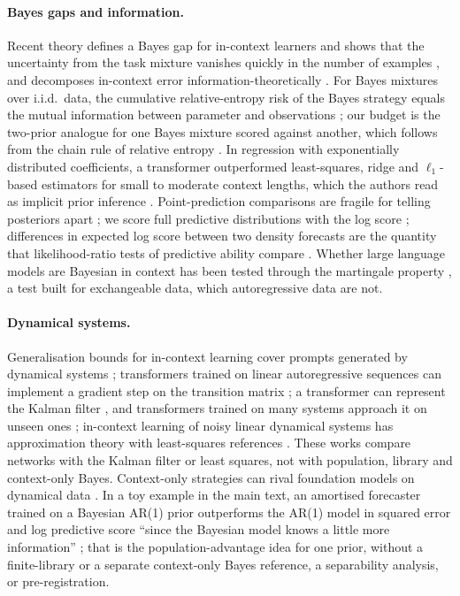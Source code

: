 \paragraph{Bayes gaps and information.} Recent theory defines a Bayes gap for in-context learners and shows that the
uncertainty from the task mixture vanishes quickly in the number of examples \citep{wakayama2026}, and decomposes in-context
error information-theoretically \citep{jeon2024}. For Bayes mixtures over i.i.d.\ data, the cumulative relative-entropy risk
of the Bayes strategy equals the mutual information between parameter and observations \citep{haussler1997}; our budget is the
two-prior analogue for one Bayes mixture scored against another, which follows from the chain rule of relative entropy
\citep{cover2006}. In regression with exponentially distributed coefficients, a transformer outperformed least-squares,
ridge and $\ell_1$-based estimators for small to moderate context lengths, which the authors read as implicit prior
inference \citep{cao2026}. Point-prediction comparisons are fragile for telling posteriors apart \citep{aswadi2026}; we score
full predictive distributions with the log score \citep{gneiting2007}; differences in expected log score between two density
forecasts are the quantity that likelihood-ratio tests of predictive ability compare \citep{amisano2007}. Whether large language models are Bayesian in context
has been tested through the martingale property \citep{falck2024}, a test built for exchangeable data, which autoregressive
data are not.

\paragraph{Dynamical systems.} Generalisation bounds for in-context learning cover prompts generated by dynamical systems
\citep{li2023algorithms}; transformers trained on linear autoregressive sequences can implement a gradient step on the
transition matrix \citep{sander2024}; a transformer can represent the Kalman filter \citep{goel2024kalman}, and transformers
trained on many systems approach it on unseen ones \citep{du2023filtering,akram2026}; in-context learning of noisy linear
dynamical systems has approximation theory with least-squares references \citep{cole2025}. These works compare networks with
the Kalman filter or least squares, not with population, library and context-only Bayes. Context-only strategies can rival
foundation models on dynamical data \citep{zhang2026parroting}. In a toy example in the main text, an amortised forecaster
trained on a Bayesian AR(1) prior outperforms the AR(1) model in squared error and log predictive score ``since the
Bayesian model knows a little more information'' \citep{koshelev2023}; that is the population-advantage idea for one prior,
without a finite-library or a separate context-only Bayes reference, a separability analysis, or pre-registration.

